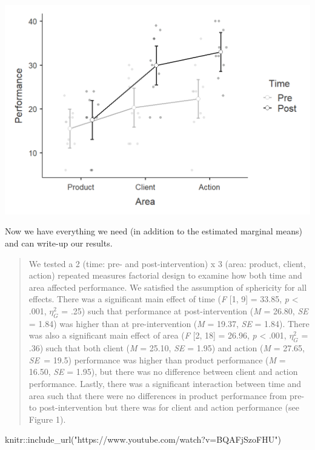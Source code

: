 \documentclass[
]{book}
\newenvironment{Shaded}{\begin{snugshade}}{\end{snugshade}}
\newcommand{\FunctionTok}[1]{\textcolor[rgb]{0.00,0.00,0.00}{#1}}
\newcommand{\NormalTok}[1]{#1}
\newcommand{\SpecialCharTok}[1]{\textcolor[rgb]{0.00,0.00,0.00}{#1}}
\newcommand{\StringTok}[1]{\textcolor[rgb]{0.31,0.60,0.02}{#1}}
\begin{document}
\includegraphics{images/06-factorial-anova/rm-factorial_interaction.png}

Now we have everything we need (in addition to the estimated marginal means) and can write-up our results.

\begin{quote}
We tested a 2 (time: pre- and post-intervention) x 3 (area: product, client, action) repeated measures factorial design to examine how both time and area affected performance. We satisfied the assumption of sphericity for all effects. There was a significant main effect of time (\emph{F} {[}1, 9{]} = 33.85, \emph{p} \textless{} .001, \(\eta^2_G\) = .25) such that performance at post-intervention (\emph{M} = 26.80, \emph{SE} = 1.84) was higher than at pre-intervention (\emph{M} = 19.37, \emph{SE} = 1.84). There was also a significant main effect of area (\emph{F} {[}2, 18{]} = 26.96, \emph{p} \textless{} .001, \(\eta^2_G\) = .36) such that both client (\emph{M} = 25.10, \emph{SE} = 1.95) and action (\emph{M} = 27.65, \emph{SE}~= 19.5) performance was higher than product performance (\emph{M} = 16.50, \emph{SE} = 1.95), but there was no difference between client and action performance. Lastly, there was a significant interaction between time and area such that there were no differences in product performance from pre- to post-intervention but there was for client and action performance (see Figure 1).
\end{quote}

\begin{Shaded}
\begin{Highlighting}[]
\NormalTok{knitr}\SpecialCharTok{::}\FunctionTok{include\_url}\NormalTok{(}\StringTok{"https://www.youtube.com/watch?v=BQAFjSzoFHU"}\NormalTok{)}
\end{Highlighting}
\end{Shaded}
\end{document}

